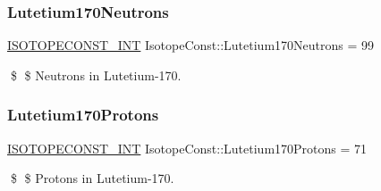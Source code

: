 \subsubsection{\texorpdfstring{Lutetium170\+Neutrons}{Lutetium170Neutrons}}
{\footnotesize\ttfamily \mbox{\hyperlink{group___isotope_const-_macros_ga5f18360b3e99483a35c32d789e62621c}{I\+S\+O\+T\+O\+P\+E\+C\+O\+N\+S\+T\+\_\+\+I\+NT}} Isotope\+Const\+::\+Lutetium170\+Neutrons = 99}

\$ \$ Neutrons in Lutetium-\/170. \mbox{\label{group___isotope_const-_lutetium-_lu170_gaf95f149ebbbfe453b7f373bac52e035a}} 
\subsubsection{\texorpdfstring{Lutetium170\+Protons}{Lutetium170Protons}}
{\footnotesize\ttfamily \mbox{\hyperlink{group___isotope_const-_macros_ga5f18360b3e99483a35c32d789e62621c}{I\+S\+O\+T\+O\+P\+E\+C\+O\+N\+S\+T\+\_\+\+I\+NT}} Isotope\+Const\+::\+Lutetium170\+Protons = 71}

\$ \$ Protons in Lutetium-\/170. 